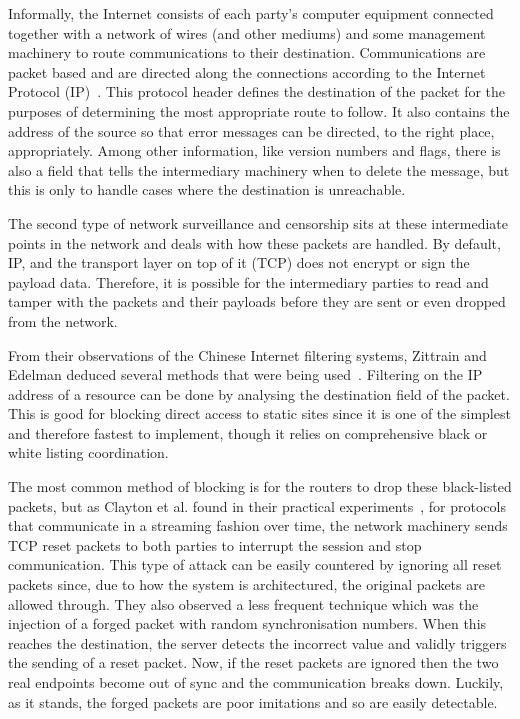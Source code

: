\documentclass[ %
                    author={Samuel Russell},
                supervisor={Prof. Bogdan Warinschi},
                    degree={MEng},
                     title={Innocuous Ciphertexts},
                  subtitle={The DE-CENSOR Scheme},
                      type={Research},
                      year={2018} ]{dissertation}
\begin{document}
Informally, the Internet consists of each party's computer equipment connected together with a network of wires (and other mediums) and some management machinery to route communications to their destination.
Communications are packet based and are directed along the connections according to the Internet Protocol (IP)~\cite{ip4}.
This protocol header defines the destination of the packet for the purposes of determining the most appropriate route to follow.
It also contains the address of the source so that error messages can be directed, to the right place, appropriately.
Among other information, like version numbers and flags, there is also a field that tells the intermediary machinery when to delete the message, but this is only to handle cases where the destination is unreachable.

The second type of network surveillance and censorship sits at these intermediate points in the network and deals with how these packets are handled. By default, IP, and the transport layer on top of it (TCP) does not encrypt or sign the payload data. Therefore, it is possible for the intermediary parties to read and tamper with the packets and their payloads before they are sent or even dropped from the network.

From their observations of the Chinese Internet filtering systems, Zittrain and Edelman deduced several methods that were being used~\cite{edelman2005empirical}.
Filtering on the IP address of a resource can be done by analysing the destination field of the packet. This is good for blocking direct access to static sites since it is one of the simplest and therefore fastest to implement, though it relies on comprehensive black or white listing coordination.

The most common method of blocking is for the routers to drop these black-listed packets, but as Clayton et al. found in their practical experiments~\cite{clayton2006ignoring}, for protocols that communicate in a streaming fashion over time, the network machinery sends TCP reset packets to both parties to interrupt the session and stop communication. This type of attack can be easily countered by ignoring all reset packets since, due to how the system is architectured, the original packets are allowed through. They also observed a less frequent technique which was the injection of a forged packet with random synchronisation numbers. When this reaches the destination, the server detects the incorrect value and validly triggers the sending of a reset packet. Now, if the reset packets are ignored then the two real endpoints become out of sync and the communication breaks down. Luckily, as it stands, the forged packets are poor imitations and so are easily detectable.
\end{document}

